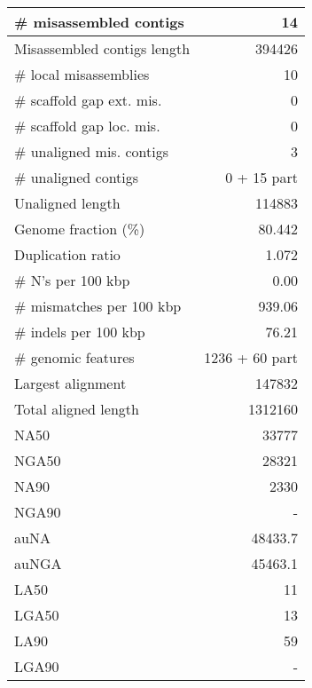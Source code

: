 \documentclass[12pt,a4paper]{article}
\begin{document}
\begin{table}[ht]
\begin{center}
\begin{tabular}{|l*{1}{|r}|}
\# misassembled contigs & 14 \\ \hline
Misassembled contigs length & 394426 \\ \hline
\# local misassemblies & 10 \\ \hline
\# scaffold gap ext. mis. & 0 \\ \hline
\# scaffold gap loc. mis. & 0 \\ \hline
\# unaligned mis. contigs & 3 \\ \hline
\# unaligned contigs & 0 + 15 part \\ \hline
Unaligned length & 114883 \\ \hline
Genome fraction (\%) & 80.442 \\ \hline
Duplication ratio & 1.072 \\ \hline
\# N's per 100 kbp & 0.00 \\ \hline
\# mismatches per 100 kbp & 939.06 \\ \hline
\# indels per 100 kbp & 76.21 \\ \hline
\# genomic features & 1236 + 60 part \\ \hline
Largest alignment & 147832 \\ \hline
Total aligned length & 1312160 \\ \hline
NA50 & 33777 \\ \hline
NGA50 & 28321 \\ \hline
NA90 & 2330 \\ \hline
NGA90 & - \\ \hline
auNA & 48433.7 \\ \hline
auNGA & 45463.1 \\ \hline
LA50 & 11 \\ \hline
LGA50 & 13 \\ \hline
LA90 & 59 \\ \hline
LGA90 & - \\ \hline
\end{tabular}
\end{center}
\end{table}
\end{document}

